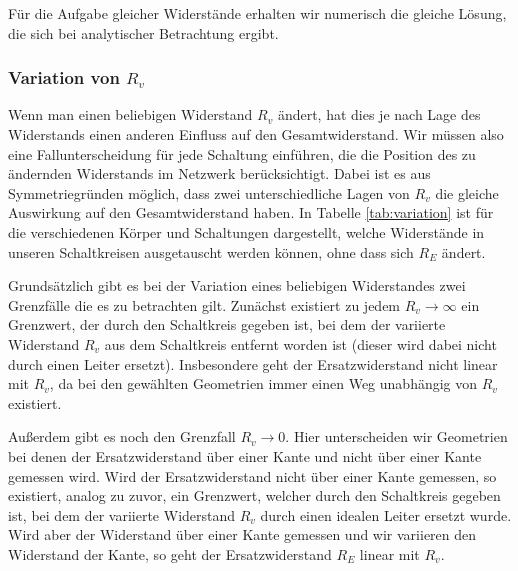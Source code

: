 \documentclass[10pt,a4paper]{article}
\begin{document}
Für die Aufgabe gleicher Widerstände erhalten wir numerisch die gleiche Lösung, die sich bei analytischer Betrachtung ergibt.

\subsubsection{Variation von $R_v$}
\label{sec:variation}
Wenn man einen beliebigen Widerstand $R_v$ ändert, hat dies je nach Lage des Widerstands einen anderen Einfluss auf den Gesamtwiderstand. Wir müssen also eine Fallunterscheidung für jede Schaltung einführen, die die Position des zu ändernden Widerstands im Netzwerk berücksichtigt. Dabei ist es aus Symmetriegründen möglich, dass zwei unterschiedliche Lagen von $R_v$ die gleiche Auswirkung auf den Gesamtwiderstand haben. In Tabelle \ref{tab:variation} ist für die verschiedenen Körper und Schaltungen dargestellt, welche Widerstände in unseren Schaltkreisen ausgetauscht werden können, ohne dass sich $R_E$ ändert.

Grundsätzlich gibt es bei der Variation eines beliebigen Widerstandes zwei Grenzfälle die es zu betrachten gilt. Zunächst existiert zu jedem $R_v \rightarrow \infty$ ein Grenzwert, der durch den Schaltkreis gegeben ist, bei dem der variierte Widerstand $R_v$ aus dem Schaltkreis entfernt worden ist (dieser wird dabei nicht durch einen Leiter ersetzt). Insbesondere geht der Ersatzwiderstand nicht linear mit $R_v$, da bei den gewählten Geometrien immer einen Weg unabhängig von $R_v$ existiert.

Außerdem gibt es noch den Grenzfall $R_v \rightarrow 0$. Hier unterscheiden wir Geometrien bei denen der Ersatzwiderstand über einer Kante und nicht über einer Kante gemessen wird. Wird der Ersatzwiderstand nicht über einer Kante gemessen, so existiert, analog zu zuvor, ein Grenzwert, welcher durch den Schaltkreis gegeben ist, bei dem der variierte Widerstand $R_v$ durch einen idealen Leiter ersetzt wurde. Wird aber der Widerstand über einer Kante gemessen und wir variieren den Widerstand der Kante, so geht der Ersatzwiderstand $R_E$ linear mit $R_v$.
\end{document}
